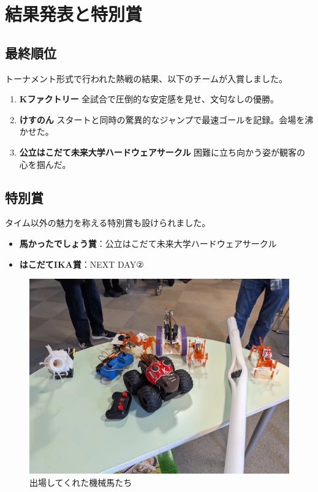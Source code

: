 \chapter{結果発表と特別賞}
\section{最終順位}
トーナメント形式で行われた熱戦の結果、以下のチームが入賞しました。

\begin{enumerate}
  \item \textbf{Kファクトリー}  
  全試合で圧倒的な安定感を見せ、文句なしの優勝。
  
  \item \textbf{けすのん}  
  スタートと同時の驚異的なジャンプで最速ゴールを記録。会場を沸かせた。
  
  \item \textbf{公立はこだて未来大学ハードウェアサークル}  
  困難に立ち向かう姿が観客の心を掴んだ。
\end{enumerate}

\section{特別賞}
タイム以外の魅力を称える特別賞も設けられました。

\begin{itemize}
  \item \textbf{馬かったでしょう賞}：公立はこだて未来大学ハードウェアサークル
  
  \item \textbf{はこだてIKA賞}：NEXT DAY②
\end{itemize}

\begin{figure}[h]
\centering
\includegraphics[width=0.7\linewidth]{pages/images/all-robots.png}
\caption{出場してくれた機械馬たち}
\end{figure}


